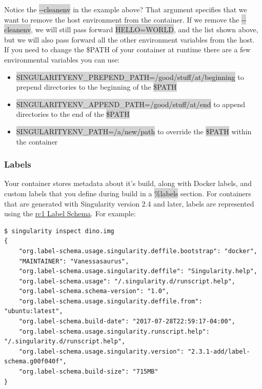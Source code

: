 \documentclass[a4paper]{article}
\begin{document}
Notice the \colorbox{lightgray}{-{}-cleanenv} in the example above? That argument specifies that we want to remove the host environment from the container. If we remove the \colorbox{lightgray}{-{}-cleanenv}, we will still pass forward \colorbox{lightgray}{HELLO=WORLD}, and the list shown above, but we will also pass forward all the other environment variables from the host.
\\[0.1in]

If you need to change the \$PATH of your container at runtime there are a few environmental variables you can use:
\\[0.1in]

\begin{itemize}
\item \colorbox{lightgray}{SINGULARITYENV\_PREPEND\_PATH=/good/stuff/at/beginning} to prepend directories to the beginning of the \colorbox{lightgray}{\$PATH}
\item \colorbox{lightgray}{SINGULARITYENV\_APPEND\_PATH=/good/stuff/at/end} to append directories to the end of the \colorbox{lightgray}{\$PATH}
\item \colorbox{lightgray}{SINGULARITYENV\_PATH=/a/new/path} to override the \colorbox{lightgray}{\$PATH} within the container
\end{itemize}

\subsubsection{Labels}

Your container stores metadata about it’s build, along with Docker labels, and custom labels that you define during build in a \colorbox{lightgray}{\%labels} section. For containers that are generated with Singularity version 2.4 and later, labels are represented using the \href{http://label-schema.org/rc1/}{rc1 Label Schema}. For example:\\[0.1in]

\begin{lstlisting}[frame=single]  
$ singularity inspect dino.img
{
    "org.label-schema.usage.singularity.deffile.bootstrap": "docker",
    "MAINTAINER": "Vanessasaurus",
    "org.label-schema.usage.singularity.deffile": "Singularity.help",
    "org.label-schema.usage": "/.singularity.d/runscript.help",
    "org.label-schema.schema-version": "1.0",
    "org.label-schema.usage.singularity.deffile.from": "ubuntu:latest",
    "org.label-schema.build-date": "2017-07-28T22:59:17-04:00",
    "org.label-schema.usage.singularity.runscript.help": "/.singularity.d/runscript.help",
    "org.label-schema.usage.singularity.version": "2.3.1-add/label-schema.g00f040f",
    "org.label-schema.build-size": "715MB"
}
\end{lstlisting}
\end{document}
